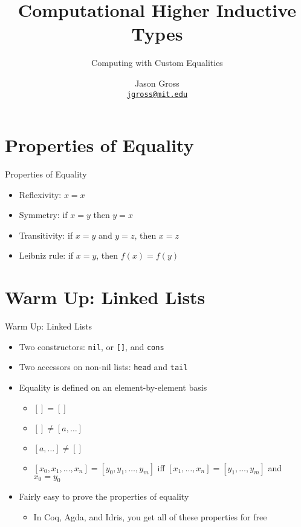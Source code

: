\documentclass{beamer}
\title[HITs]{Computational Higher Inductive Types}
\subtitle{Computing with Custom Equalities}
\author[Jason Gross]{Jason Gross\texorpdfstring{ \\ \texttt{\href{mailto:jgross@mit.edu}{jgross@mit.edu}}}{}}
\institute{MIT CSAIL Student Workshop}
\begin{document}
\begin{frame}
  \maketitle
\end{frame}

\begin{frame}
  \tableofcontents
\end{frame}

\section{Properties of Equality}
\begin{frame}{Properties of Equality}
  \pause
  \begin{itemize}
    \item Reflexivity: $x = x$ \pause
    \item Symmetry: if $x = y$ then $y = x$ \pause
    \item Transitivity: if $x = y$ and $y = z$, then $x = z$ \pause
    \item Leibniz rule: if $x = y$, then $f(x) = f(y)$
  \end{itemize}
\end{frame}

\section{Warm Up: Linked Lists}
\begin{frame}{Warm Up: Linked Lists}
  \begin{itemize}
    \item Two constructors: \pause \texttt{nil}, or \texttt{[]}, and \texttt{cons} \pause
    \item Two accessors on non-nil lists: \pause \texttt{head} and \texttt{tail} \pause
    \item Equality is defined on an element-by-element basis
       \begin{itemize}
         \item $[] = []$
         \item $[] \ne [a,\ldots]$
         \item $[a,\ldots] \ne []$
         \item $[x_0,x_1,\ldots, x_n] = [y_0,y_1,\ldots,y_m]$ iff $[x_1,\ldots,x_n] = [y_1,\ldots,y_m]$ and $x_0 = y_0$
       \end{itemize} \pause
     \item Fairly easy to prove the properties of equality
       \begin{itemize}
         \item In Coq, Agda, and Idris, you get all of these properties for free
       \end{itemize}
   \end{itemize}
\end{frame}
\end{document}

